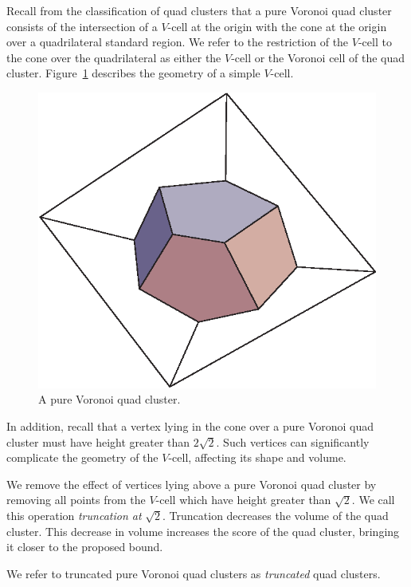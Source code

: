 Recall from the classification of quad clusters
that a pure Voronoi quad cluster consists of the intersection of a
$V$-cell at the origin with the cone at the origin over a quadrilateral
standard region.  We refer to the restriction of the $V$-cell to the
cone over the quadrilateral as either the $V$-cell
or the Voronoi cell of the quad cluster.
Figure~\ref{fig:vor} describes the geometry of a simple
$V$-cell.

\begin{figure}
\begin{center}
\includegraphics{PS/vor}
\end{center}
\caption{A pure Voronoi quad cluster.}
\label{fig:vor}
\end{figure}

In addition, recall that a vertex lying in the cone over a pure
Voronoi quad cluster must have height greater than $2\sqrt{2}$.
Such vertices can significantly complicate the geometry of the $V$-cell,
affecting its shape and volume.

We remove the effect of vertices lying above a pure Voronoi quad cluster
by removing all points from the $V$-cell which have height greater than
$\sqrt{2}$.  We call this operation {\em truncation at} $\sqrt{2}$.
Truncation decreases the volume of the quad cluster.  This decrease in
volume increases the score of the quad cluster, bringing it closer to
the proposed bound.

We refer to truncated pure Voronoi quad clusters as {\em truncated} quad
clusters.

